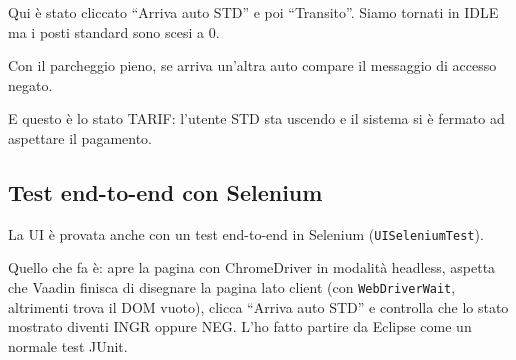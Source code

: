 
Qui è stato cliccato ``Arriva auto STD'' e poi ``Transito''. Siamo tornati in IDLE ma i posti
standard sono scesi a 0.




Con il parcheggio pieno, se arriva un'altra auto compare il messaggio di accesso
negato.


E questo è lo stato TARIF: l'utente STD sta uscendo e il sistema si è fermato ad
aspettare il pagamento.




\subsection{Test end-to-end con Selenium}

La UI è provata anche con un test end-to-end in Selenium (\texttt{UISeleniumTest}). 

Quello che fa è: apre la pagina con ChromeDriver in modalità headless, aspetta che Vaadin
finisca di disegnare la pagina lato client (con \texttt{WebDriverWait}, altrimenti trova
il DOM vuoto), clicca ``Arriva auto STD'' e controlla che lo stato mostrato diventi INGR
oppure NEG. L'ho fatto partire da Eclipse come un normale test JUnit.


\newpage